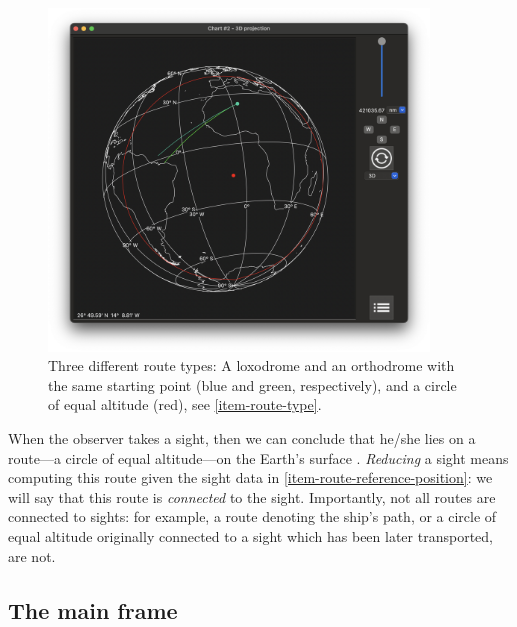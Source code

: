 \documentclass{ol-softwaremanual}
\begin{document}
\begin{figure}
  \centering
  \includegraphics[width=0.9\textwidth]{figures/route-types.png}
  \caption{
    \label{fig-route-types}
    Three different route types: A loxodrome and an orthodrome with the same starting point (blue and green, respectively), and a circle of equal altitude (red), see \cref{item-route-type}. 
  }
  \end{figure}


When the observer takes a sight, then we can conclude that he/she lies on a route---a circle of equal altitude---on the Earth's surface \cite{bowditch2002the}. 
\textit{Reducing} a sight means computing this route given the sight data in \cref{item-route-reference-position}: we will say that this route is \textit{connected} to the sight. Importantly, not all routes are connected to sights: for example, a route denoting the ship's path, or a circle of equal altitude originally connected to a sight which has been later transported, are not. 

\subsection{The main frame}
\end{document}
